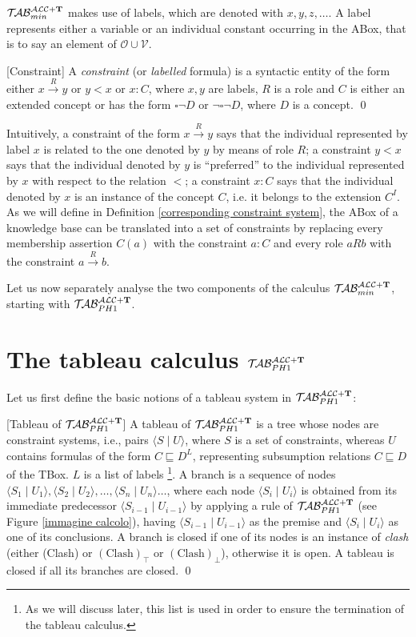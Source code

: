 \documentclass[a4paper, 11pt, oneside]{duthesis}
\newcommand{\tip}{{\bf T}}
\newcommand{\unione} {\cup}
\newcommand{\nott} {\lnot}
\newcommand{\tc} {\mid}
\newcommand{\bbox}{\square}
\newcommand{\sx} {\langle}
\newcommand{\dx} {\rangle}
\newcommand{\nuovoc}{\mathrel{{\mathcal{T}\!\mathcal{AB}}}_{min}^{\mathcal{ALC}+\mbox{\scriptsize $\tip$}}}
\newcommand{\primo}{\mathrel{{\mathcal{T}\!\mathcal{AB}}}_{PH 1}^{\mathcal{ALC}+\mbox{\scriptsize $\tip$}}}
\newcommand{\trans}[1]{\stackrel{#1}{\longrightarrow}}
\newenvironment{definition}
{\begin{defi} \rm}{\qed \end{defi}}
\newenvironment{definition}
{\begin{defi} \rm}{\qed \end{defi}}
\newtheorem{definition}{Definition}
\newcounter{posu}
\newtheorem{definition}[posu]{Definition}
\begin{document}
$\nuovoc$ makes use of labels, which are denoted with $x, y, z, \dots$.
A label represents either a variable or an individual constant occurring in the ABox, that is to say an element of $\mathcal{O} \unione \mathcal{V}$.

\begin{definition}[Constraint]
A \emph{constraint} (or \emph{labelled} formula) is a syntactic entity of the form either $x \trans{R} y$ or $y<x$ or $x: C$, where $x, y$ are labels, $R$ is a role and $C$ is either an extended concept or has the form $\bbox \nott D$ or $\nott \bbox \nott D$, where $D$ is a concept.
\end{definition}

\noindent Intuitively, a constraint of the form $x \trans{R} y$ says that the individual represented by label $x$ is related to the one denoted by $y$ by means of role $R$; a constraint $y<x$ says that the individual denoted by $y$ is ``preferred'' to the individual represented by $x$ with respect to the relation $<$; a constraint $x: C$ says that the individual denoted by $x$ is an instance of the concept $C$, i.e. it belongs to the extension $C^I$.
As we will define in Definition \ref{corresponding constraint system}, the ABox of a knowledge base can be translated into a set of constraints by replacing every membership assertion $C(a)$ with the constraint $a: C$ and every role $a R b$ with the constraint $a \trans{R} b$.

Let us now separately analyse the two components of the calculus $\nuovoc$, starting with $\primo$.

\section{The tableau calculus $\primo$}\label{tableau_ph1}

Let us first define the basic notions of a tableau system in $\primo$:


\begin{definition}[Tableau of $\primo$]\label{deftableau}
A tableau of $\primo$ is a tree whose nodes are constraint systems, i.e., pairs $\sx S \tc U \dx$, where $S$ is a set of constraints, whereas $U$ contains formulas of the form $C \sqsubseteq D^L$, representing subsumption relations $C \sqsubseteq D$ of the TBox.
$L$ is a list of labels
\footnote{As we will discuss later, this list is used in order to ensure the termination of the tableau calculus.}.
A branch is a sequence of nodes $\sx S_1 \tc U_1 \dx, \sx S_2 \tc U_2 \dx, \dots, \sx S_n  \tc U_n \dx \dots$, where each node $\sx S_i \tc U_i \dx$ is obtained from its immediate predecessor $\sx S_{i-1} \tc U_{i-1} \dx$ by applying a rule of $\primo$ (see Figure \ref{immagine calcolo}), having $\sx S_{i-1} \tc U_{i-1} \dx$ as the premise and $\sx S_{i} \tc U_{i} \dx$ as one of its conclusions.
A branch is closed if one of its nodes is an instance of \emph{clash} (either (Clash) or $(\mbox{Clash})_\top$ or $(\mbox{Clash})_\bot$), otherwise it is open.
A tableau is closed if all its branches are closed.
\end{definition}
\end{document}
